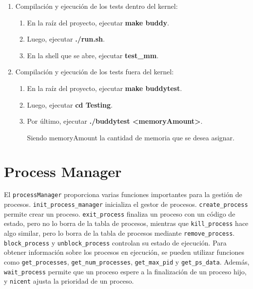 \documentclass{article}
\begin{document}
\begin{enumerate}

\item Compilación y ejecución de los tests dentro del kernel:

\begin{enumerate}
    \item En la raíz del proyecto, ejecutar \textbf{make buddy}.
    \item Luego, ejecutar \textbf{./run.sh}.
    \item En la shell que se abre, ejecutar \textbf{test\_mm}.
\end{enumerate}

\item Compilación y ejecución de los tests fuera del kernel:

\begin{enumerate}
    \item En la raíz del proyecto, ejecutar \textbf{make buddytest}.
    \item Luego, ejecutar \textbf{cd Testing}.
    \item Por último, ejecutar \textbf{./buddytest \textless memoryAmount\textgreater}.

    Siendo memoryAmount la cantidad de memoria que se desea asignar.
\end{enumerate}
\end{enumerate}

\section {Process Manager}
El \texttt{processManager} proporciona varias funciones importantes para la gestión de procesos.\newline
\texttt{init\_process\_manager} inicializa el gestor de procesos. \texttt{create\_process} permite crear un proceso. \texttt{exit\_process} finaliza un proceso con un código de estado, pero no lo borra de la tabla de procesos, mientras que \texttt{kill\_process} hace algo similar, pero lo borra de la tabla de procesos mediante \texttt{remove\_process}. \texttt{block\_process} y \texttt{unblock\_process} controlan su estado de ejecución. Para obtener información sobre los procesos en ejecución, se pueden utilizar funciones como \texttt{get\_processes}, \texttt{get\_num\_processes}, \texttt{get\_max\_pid} y \texttt{get\_ps\_data}. Además, \texttt{wait\_process} permite que un proceso espere a la finalización de un proceso hijo, y \texttt{nicent} ajusta la prioridad de un proceso.
\end{document}
